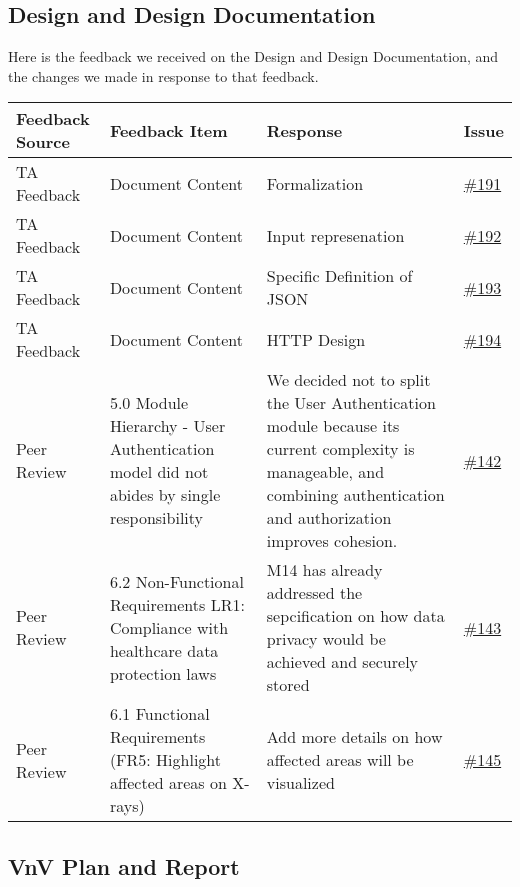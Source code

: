 \documentclass{article}
\begin{document}
\subsection{Design and Design Documentation}

Here is the feedback we received on the Design and Design Documentation, and the changes we made in response to that feedback.
\begin{longtable}{| p{} | p{} | p{} | p{} |}
\hline
\textbf{Feedback Source} & \textbf{Feedback Item} & \textbf{Response} & \textbf{Issue} \\
\hline
TA Feedback & Document Content & Formalization  & \href{https://github.com/RezaJodeiri/CXR-Capstone/issues/191}{\#191} \\
\hline
TA Feedback & Document Content & Input represenation & \href{https://github.com/RezaJodeiri/CXR-Capstone/issues/192}{\#192} \\
\hline
TA Feedback & Document Content & Specific Definition of JSON & \href{https://github.com/RezaJodeiri/CXR-Capstone/issues/193}{\#193} \\
\hline
TA Feedback & Document Content & HTTP Design & \href{https://github.com/RezaJodeiri/CXR-Capstone/issues/194}{\#194} \\
\hline
Peer Review & 5.0 Module Hierarchy - User Authentication model did not abides by single responsibility & We decided not to split the User Authentication module because its current complexity is manageable, and combining authentication and authorization improves cohesion. &\href{https://github.com/RezaJodeiri/CXR-Capstone/issues/142}{\#142}\\
\hline
Peer Review & 6.2 Non-Functional Requirements LR1: Compliance with healthcare data protection laws & M14 has already addressed the sepcification on how data privacy would be achieved and securely stored & \href{https://github.com/RezaJodeiri/CXR-Capstone/issues/143}{\#143}\\
\hline
Peer Review & 6.1 Functional Requirements (FR5: Highlight affected areas on X-rays) & Add more details on how affected areas will be visualized & \href{https://github.com/RezaJodeiri/CXR-Capstone/issues/145}{\#145}
\hline
\end{longtable}


\subsection{VnV Plan and Report}
\end{document}
